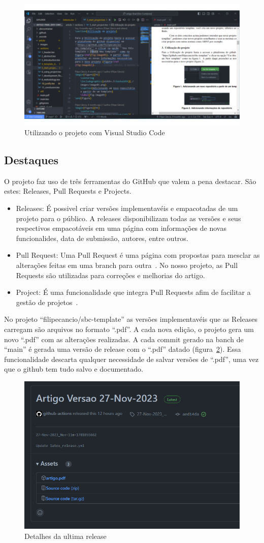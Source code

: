 \begin{itemize}
	\begin{figure}[H]
		\centering
		\includegraphics[width=.6\textwidth]{./images/fig01.png}
		\caption{Utilizando o projeto com Visual Studio Code}
		\label{fig:fig03}
	\end{figure}
\end{itemize}

\subsection{Destaques}
O projeto faz uso de três ferramentas do GitHub que valem a pena destacar. São estes: Releases, Pull Requests e Projects.
\begin{itemize}
	\item Releases: É possivel criar versões implementavéis e empacotadas de um projeto para o público. A releases disponibilizam todas as versões e seus respectivos empacotáveis em uma página com informações de novas funcionalides, data de submissão, autores, entre outros.~\cite{github:03}
	\item Pull Request: Uma Pull Request é uma página com propostas para mesclar as alterações feitas em uma branch para outra~\cite{github:04}. No nosso projeto, as Pull Requests são utilizadas para correções e melhorias do artigo.
	\item Project: É uma funcionalidade que integra Pull Requests afim de facilitar a gestão de projetos~\cite{github:05}.
\end{itemize}


No projeto ``filipecancio/sbc-template'' as versões implementavéis que as Releases carregam são arquivos no formato ``.pdf''. A cada nova edição, o projeto gera um novo ``.pdf'' com as alterações realizadas. A cada commit gerado na banch de ``main'' é gerada uma versão de release com o ``.pdf'' datado (figura~\ref{fig:fig04}). Essa funcionalidade descarta qualquer necessidade de salvar versões de ``.pdf'', uma vez que o github tem tudo salvo e documentado.
\begin{figure}[H]
	\centering
	\includegraphics[width=.6\textwidth]{./images/fig04.png}
	\caption{Detalhes da ultima release}
	\label{fig:fig04}
\end{figure}

